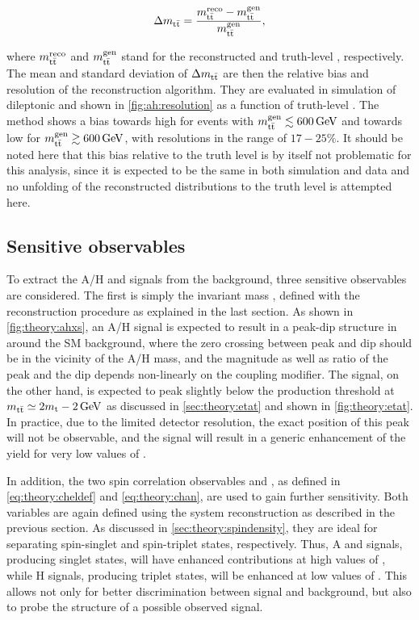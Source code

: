 \begin{equation}
\label{eq:ah:deltamtt}
    \Delta m_{\mathrm{t \bar{t}}} = \frac{m_{\mathrm{t \bar{t}}}^{\mathrm{reco}} - m_{\mathrm{t \bar{t}}}^{\mathrm{gen}}} {m_{\mathrm{t \bar{t}}}^{\mathrm{gen}}},
\end{equation}

\noindent where $m_{\mathrm{t \bar{t}}}^{\mathrm{reco}}$ and $m_{\mathrm{t \bar{t}}}^{\mathrm{gen}}$ stand for the reconstructed and truth-level \mtt, respectively. The mean and standard deviation of $\Delta m_{\mathrm{t \bar{t}}}$ are then the relative bias and resolution of the reconstruction algorithm. They are evaluated in simulation of dileptonic \ttbar and shown in \cref{fig:ah:resolution} as a function of truth-level \mtt. The method shows a bias towards high \mtt for events with $\mtt^{\mathrm{gen}} \lesssim \SI{600}{\GeV}$ and towards low \mtt for $\mtt^{\mathrm{gen}} \gtrsim \SI{600}{\GeV}$, with resolutions in the range of $17-25\%$. It should be noted here that this bias relative to the truth level is by itself not problematic for this analysis, since it is expected to be the same in both simulation and data and no unfolding of the reconstructed distributions to the truth level is attempted here.

\subsection{Sensitive observables}

To extract the A/H and \etat signals from the background, three sensitive observables are considered. The first is simply the invariant \ttbar mass \mtt, defined with the reconstruction procedure as explained in the last section. As shown in \cref{fig:theory:ahxs}, an A/H signal is expected to result in a peak-dip structure in \mtt around the SM background, where the zero crossing between peak and dip should be in the vicinity of the A/H mass, and the magnitude as well as ratio of the peak and the dip depends non-linearly on the coupling modifier. The \etat signal, on the other hand, is expected to peak slightly below the \ttbar production threshold at $m_{\mathrm{t \bar{t}}} \simeq 2 m_{\mathrm{t}} - \SI{2}{GeV}$ as discussed in \cref{sec:theory:etat} and shown in \cref{fig:theory:etat}. In practice, due to the limited detector resolution, the exact position of this peak will not be observable, and the signal will result in a generic enhancement of the yield for very low values of \mtt.

In addition, the two spin correlation observables \chel and \chan, as defined in \cref{eq:theory:cheldef} and \cref{eq:theory:chan}, are used to gain further sensitivity. Both variables are again defined using the \ttbar system reconstruction as described in the previous section. As discussed in \cref{sec:theory:spindensity}, they are ideal for separating spin-singlet and spin-triplet states, respectively. Thus, A and \etat signals, producing singlet states, will have enhanced contributions at high values of \chel, while H signals, producing  triplet states, will be enhanced at low values of \chan. This allows not only for better discrimination between signal and background, but also to probe the \CP structure of a possible observed signal. 


